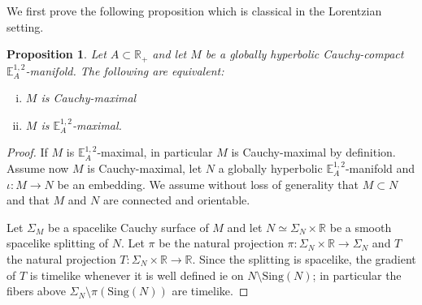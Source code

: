\documentclass[a4paper,12pt]{article}
\def\R{\mathbb{R}}
\def\sing{\mathrm{Sing}}
\def\RR{\mathbb{R}}
\newcommand{\mass}[1]{{\mathbb E}^{1,2}_{#1}}
\newtheorem{propou}[lemou]{Proposition}
\begin{document}
We first prove the following proposition which is classical in the Lorentzian setting.
\begin{propou}\label{btzprop:cauchy_abs_max}\label{prop:cauchy_abs_max}Let $A\subset \RR_+$ and let $M$ be a globally hyperbolic Cauchy-compact  $\mass{A}$-manifold. The following are equivalent:
\begin{enumerate}[(i)]
\item $M$ is Cauchy-maximal  \item $M$ is $\mass{A}$-maximal.
\end{enumerate}

\end{propou}
\begin{proof} 
If $M$ is $\mass{A}$-maximal, in particular  $M$ is Cauchy-maximal by definition. 
Assume now $M$ is Cauchy-maximal, let $N$ a globally hyperbolic $\mass{A}$-manifold and  $\iota:M\rightarrow N$ be an embedding. We assume  without loss of generality that $M\subset N$ and that $M$ and $N$ are connected and orientable.

Let $\Sigma_M$ be a spacelike Cauchy surface of $M$  and let $N \simeq \Sigma_N\times \RR$ be a smooth spacelike splitting of $N$. Let $\pi$ be the natural projection $\pi:\Sigma_N\times \RR\rightarrow \Sigma_N$ and $T$ the natural projection $T:\Sigma_N\times \RR\rightarrow \R$. Since the splitting is spacelike, the gradient of $T$ is timelike whenever it is well defined ie on $N\setminus \sing(N)$; in particular the fibers above $\Sigma_N\setminus \pi(\sing(N))$ are timelike.


\end{proof}
\end{document}
